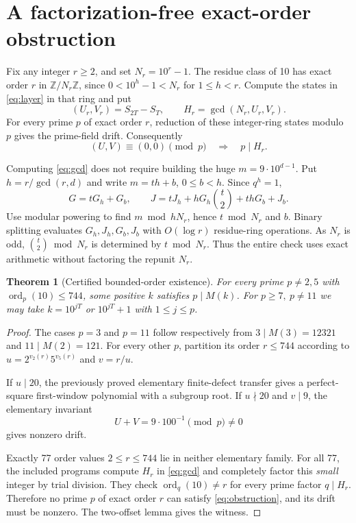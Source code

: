 \documentclass[10pt]{article}
\newtheorem{theorem}{Theorem}
\DeclareMathOperator{\ord}{ord}
\begin{document}
\section{A factorization-free exact-order obstruction}
Fix any integer \(r\ge2\), and set \(N_r=10^r-1\).
The residue class of 10 has exact order \(r\) in
\(\mathbb Z/N_r\mathbb Z\), since \(0<10^h-1<N_r\)
for \(1\le h<r\).
Compute the states in \eqref{eq:layer} in that ring and put
\begin{equation}
 (U_r,V_r)=S_{2T}-S_T,\qquad
 H_r=\gcd(N_r,U_r,V_r).
 \label{eq:gcd}
\end{equation}
For every prime \(p\) of exact order \(r\),
reduction of these integer-ring states modulo \(p\)
gives the prime-field drift. Consequently
\begin{equation}
 (U,V)\equiv(0,0)\pmod p
 \quad\Longrightarrow\quad p\mid H_r.
 \label{eq:obstruction}
\end{equation}

Computing \eqref{eq:gcd} does not require building the huge
\(m=9\cdot10^{d-1}\). Put \(h=r/\gcd(r,d)\) and
write \(m=th+b\), \(0\le b<h\). Since \(q^h=1\),
\[
 G=tG_h+G_b,\qquad
 J=tJ_h+hG_h\binom{t}{2}+thG_b+J_b.
\]
Use modular powering to find
\(m\bmod hN_r\), hence \(t\bmod N_r\) and \(b\).
Binary splitting evaluates \(G_h,J_h,G_b,J_b\)
with \(O(\log r)\) residue-ring operations.
As \(N_r\) is odd, \(\binom t2\bmod N_r\)
is determined by \(t\bmod N_r\).
Thus the entire check uses exact arithmetic without
factoring the repunit \(N_r\).

\begin{theorem}[Certified bounded-order existence]
For every prime \(p\ne2,5\) with
\(\ord_p(10)\le744\), some positive \(k\) satisfies
\(p\mid M(k)\).
For \(p\ge7,\ p\ne11\) we may take
\(k=10^{jT}\) or \(10^{jT}+1\) with \(1\le j\le p\).
\end{theorem}
\begin{proof}
The cases \(p=3\) and \(p=11\) follow respectively
from \(3\mid M(3)=12321\) and \(11\mid M(2)=121\).
For every other \(p\), partition its order \(r\le744\)
according to \(u=2^{v_2(r)}5^{v_5(r)}\) and \(v=r/u\).

If \(u\mid20\), the previously proved elementary
finite-defect transfer gives a perfect-square
first-window polynomial with a subgroup root.
If \(u\nmid20\) and \(v\mid9\), the elementary invariant
\[
 U+V=9\cdot100^{-1}\pmod p\ne0
\]
gives nonzero drift.

Exactly 77 order values \(2\le r\le744\) lie in
neither elementary family. For all 77,
the included programs compute \(H_r\) in
\eqref{eq:gcd} and completely factor this
\emph{small} integer by trial division. They check
\(\ord_q(10)\ne r\) for every prime factor \(q\mid H_r\).
Therefore no prime \(p\) of exact order \(r\)
can satisfy \eqref{eq:obstruction}, and its drift
must be nonzero. The two-offset lemma gives the witness.
\end{proof}
\end{document}
